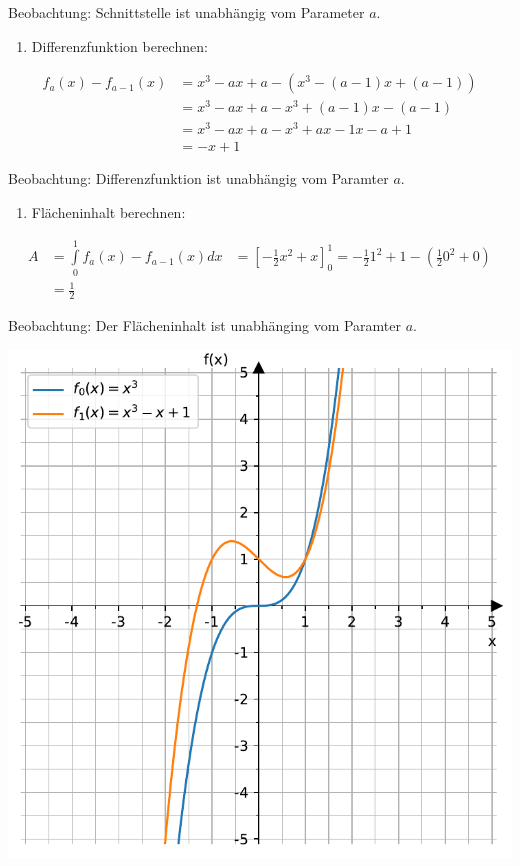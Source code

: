 \documentclass[
  letterpaper,
  DIV=11,
  numbers=noendperiod]{scrartcl}
\providecommand{\tightlist}{%
  \setlength{\itemsep}{0pt}\setlength{\parskip}{0pt}}\usepackage{longtable,booktabs,array}
\begin{document}
Beobachtung: Schnittstelle ist unabhängig vom Parameter \(a\).

\begin{enumerate}
\def\labelenumi{\arabic{enumi}.}
\setcounter{enumi}{1}
\tightlist
\item
  Differenzfunktion berechnen:
\end{enumerate}

\[
\begin{aligned}
f_a(x)-f_{a-1}(x)&= x^3 -ax +a - \left(x^3 -(a-1)x +(a-1)\right)\\
&=x^3 -ax +a -x^3 +(a-1)x -(a-1)\\
&=x^3-ax+a -x^3+ax-1x-a+1\\
&=-x+1
\end{aligned}
\]

Beobachtung: Differenzfunktion ist unabhängig vom Paramter \(a\).

\begin{enumerate}
\def\labelenumi{\arabic{enumi}.}
\setcounter{enumi}{2}
\tightlist
\item
  Flächeninhalt berechnen:
\end{enumerate}

\[
\begin{aligned}
A &=\int\limits_{0}^{1} f_a(x)-f_{a-1}(x)dx
&= \left[-\frac{1}{2}x^2 +x\right]_0^1 = -\frac{1}{2}1^2+1-\left(\frac{1}{2}0^2+0 \right)\\
&= \frac{1}{2}
\end{aligned}
\]

Beobachtung: Der Flächeninhalt ist unabhänging vom Paramter \(a\).

\includegraphics{8_Funktionsscharen_files/figure-pdf/cell-3-output-1.pdf}
\end{document}
